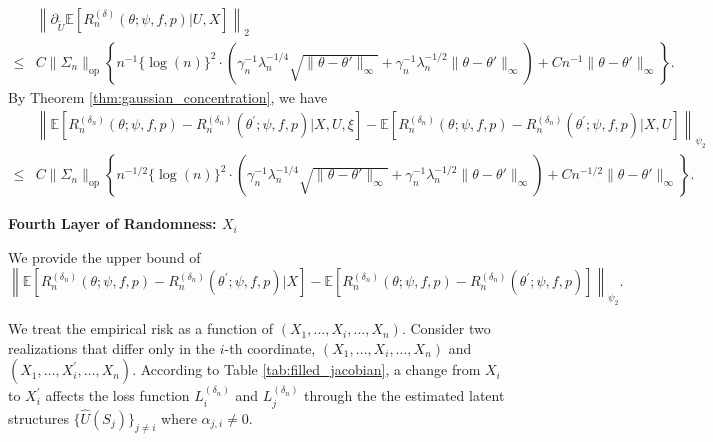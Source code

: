 \documentclass[12pt]{article}
\newcommand{\E}{\mathbb{E}}
\begin{document}
\begin{align*}
    &\left\|\partial_{ \widetilde U}\E\left[R_n^{(\delta)}(\theta;\psi,f,p)| U,X\right]\right\|_2\\
    \leq & C\|\Sigma_n\|_{\mathrm{op}} \left\{n^{-1}\{\log(n)\}^2\cdot\left( \gamma_n^{-1}\lambda_n^{-1/4}\sqrt{\|\theta-\theta'\|_\infty} + \gamma_n^{-1}\lambda_n^{-1/2}\|\theta-\theta'\|_\infty\right) + Cn^{-1}\|\theta-\theta'\|_\infty\right\}.
\end{align*}
By Theorem \ref{thm:gaussian_concentration}, we have 
\begin{align*}
    &\left\|\E\left[R_n^{(\delta_n)}(\theta;\psi,f,p)-R_n^{({\delta_n})}(\theta^\prime;\psi,f,p)|X,U,\xi\right]-\E\left[R_n^{(\delta_n)}(\theta;\psi,f,p)-R_n^{({\delta_n})}(\theta^\prime;\psi,f,p)|X,U\right]\right\|_{\psi_2}\\
    \leq & C\|\Sigma_n\|_{\mathrm{op}} \left\{n^{-1/2}\{\log(n)\}^2\cdot\left( \gamma_n^{-1}\lambda_n^{-1/4}\sqrt{\|\theta-\theta'\|_\infty} + \gamma_n^{-1}\lambda_n^{-1/2}\|\theta-\theta'\|_\infty\right) + Cn^{-1/2}\|\theta-\theta'\|_\infty\right\}.
\end{align*}



\noindent\textbf{Fourth Layer of Randomness: $X_i$}

\noindent We provide the upper bound of 
$$\left\|\E\left[R_n^{(\delta_n)}(\theta;\psi,f,p)-R_n^{({\delta_n})}(\theta^\prime;\psi,f,p)|X\right]-\E\left[R_n^{(\delta_n)}(\theta;\psi,f,p)-R_n^{({\delta_n})}(\theta^\prime;\psi,f,p)\right]\right\|_{\psi_2}.$$

We treat the empirical risk as a function of $(X_1, \ldots,X_i,\ldots, X_n)$. Consider two realizations that differ only in the $i$-th coordinate, $(X_1, \ldots,X_i,\ldots, X_n)$ and $(X_1, \ldots,X_i^\prime,\ldots, X_n)$. According to Table \ref{tab:filled_jacobian}, a change from $X_i$ to $X_i^\prime$ affects the loss function $L_i^{(\delta_n)}$ and $L_j^{(\delta_n)}$ through the the estimated latent structures $\{\widehat U(S_j)\}_{j\neq i}$ where $\alpha_{j,i}\neq 0$. 
\end{document}
